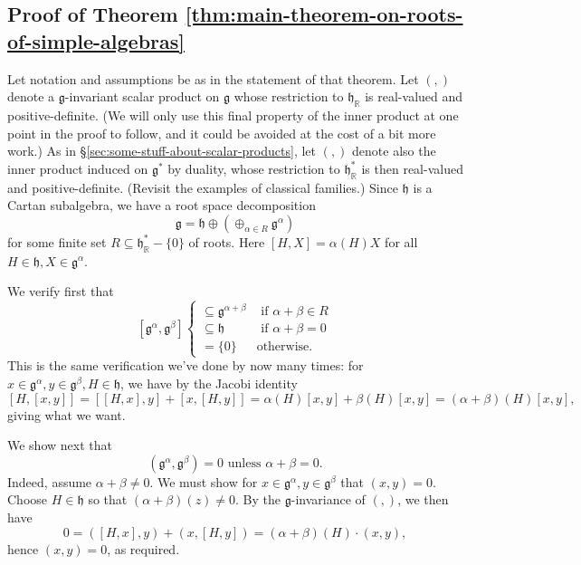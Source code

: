 \documentclass[reqno]{amsart} 
\begin{document}
\subsection{Proof of Theorem \ref{thm:main-theorem-on-roots-of-simple-algebras}}
\label{sec:orgfd608b2}
Let notation and assumptions be as in the statement of that theorem.  Let $(,)$ denote a $\mathfrak{g}$-invariant scalar product on $\mathfrak{g}$ whose restriction to $\mathfrak{h}_\mathbb{R}$ is real-valued and positive-definite.  (We will only use this final property of the inner product at one point in the proof to follow, and it could be avoided at the cost of a bit more work.)  As in \S\ref{sec:some-stuff-about-scalar-products}, let $(,)$ denote also the inner product induced on $\mathfrak{g}^*$ by duality, whose restriction to $\mathfrak{h}_\mathbb{R}^*$ is then real-valued and positive-definite.  (Revisit the examples of classical families.)  Since $\mathfrak{h}$ is a Cartan subalgebra, we have a root space decomposition
\begin{equation*}
  \mathfrak{g} = \mathfrak{h} \oplus (\oplus_{\alpha \in R} \mathfrak{g}^\alpha)
\end{equation*}
for some finite set $R \subseteq \mathfrak{h}_\mathbb{R}^* - \{0\}$ of roots.  Here $[H,X] = \alpha(H) X$ for all $H \in \mathfrak{h}, X \in \mathfrak{g}^\alpha$.

We verify first that
\begin{equation}
  {} [\mathfrak{g}^\alpha, \mathfrak{g}^\beta]
  \begin{cases}
    \subseteq \mathfrak{g}^{\alpha+\beta} & \text{ if } \alpha + \beta \in R \\
    \subseteq \mathfrak{h} & \text{ if } \alpha + \beta =0 \\
    = \{0\} & \text{otherwise.}
  \end{cases}
\end{equation}
This is the same verification we've done by now many times: for $x \in \mathfrak{g}^\alpha, y \in \mathfrak{g}^\beta, H \in \mathfrak{h}$, we have by the Jacobi identity
\begin{equation*}
  {} [H,[x,y]]
  = [[H, x],y] +[x,[H, y]] = \alpha(H) [x,y] + \beta(H) [x,y] = (\alpha + \beta)(H) [x,y],
\end{equation*}
giving what we want.

We show next that
\begin{equation}
  (\mathfrak{g}^\alpha, \mathfrak{g}^\beta) = 0 \text{ unless } \alpha + \beta = 0.
\end{equation}
Indeed, assume $\alpha + \beta \neq 0$.  We must show for $x \in \mathfrak{g}^\alpha, y \in \mathfrak{g}^\beta$ that $(x,y) = 0$.  Choose $H \in \mathfrak{h}$ so that $(\alpha + \beta)(z) \neq 0$.  By the $\mathfrak{g}$-invariance of $(,)$, we then have
\begin{equation*}
  0 = ([H,x],y) + (x,[H,y]) = (\alpha + \beta)(H) \cdot (x,y),
\end{equation*}
hence $(x,y) = 0$, as required.
\end{document}
